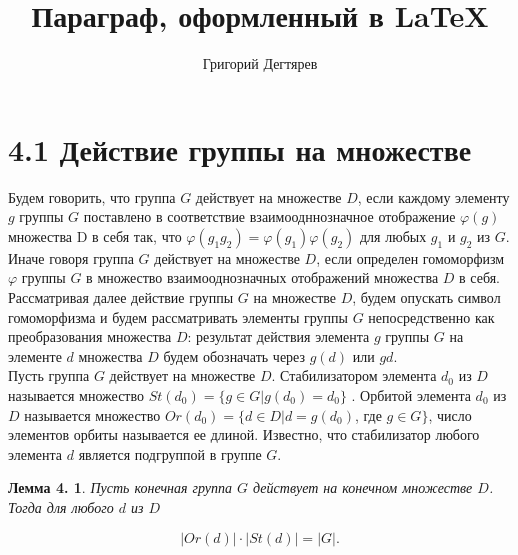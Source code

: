 \documentclass{article}
\numberwithin{equation}{section}
\begin{document}
\title{Параграф, оформленный в  \LaTeX{}}
\author{Григорий Дегтярев}
\maketitle
\tableofcontents
\newpage
\section{4.1 Действие группы на множестве}
Будем говорить, что группа $G$ действует на множестве $D$, если каждому элементу $g$ группы $G$ поставлено в соответствие взаимоодннозначное отображение $\varphi(g)$ множества D в себя так, что $\varphi(g_1g_2)=\varphi(g_1)\varphi(g_2)$ для любых $g_1$  и $g_2$ из $G$. Иначе говоря группа $G$ действует на множестве $D$, если определен гомоморфизм $\varphi$ группы $G$ в множество взаимооднозначных отображений множества $D$ в себя. Рассматривая далее действие группы $G$ на множестве $D$, будем опускать символ гомоморфизма и будем рассматривать элементы группы $G$ непосредственно как преобразования множества $D$: результат действия элемента $g$ группы $G$ на элементе $d$ множества $D$ будем обозначать через $g(d)$ или $gd$. \\
Пусть группа $G$ действует на множестве $D$. Стабилизатором элемента $d_0$ из $D$  называется множество $St(d_0) =   \{g \in  G|g(d_0) =  d_0 \}$ . Орбитой элемента $d_0$  из $D$  называется  множество  $Or(d_0) = \{d\in  D|d=g(d_0)$, где $g \in  G \}$, число элементов орбиты называется ее длиной. Известно, что стабилизатор любого элемента $d$ является подгруппой в группе $G$. \\ 
\newtheorem{Def}{Лемма 4.}
		\begin{Def}\label{fourone}
			Пусть конечная группа $G$ действует на конечном множестве $D$. Тогда для любого $d$ из $D$
		\end{Def}
					$$|Or(d)|\cdot|St(d)| = |G|.$$
\end{document}
